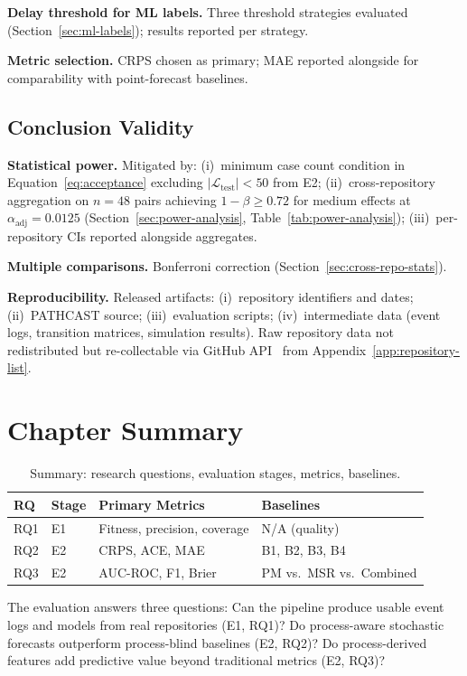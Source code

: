 \textbf{Delay threshold for ML labels.} Three threshold strategies
evaluated (Section~\ref{sec:ml-labels}); results reported per strategy.

\textbf{Metric selection.} CRPS chosen as primary; MAE reported
alongside for comparability with point-forecast baselines.


\subsection{Conclusion Validity}
\label{sec:threats-conclusion}

\textbf{Statistical power.} Mitigated by:
(i)~minimum case count condition in Equation~\ref{eq:acceptance}
excluding $|\mathcal{L}_{\text{test}}| < 50$ from E2;
(ii)~cross-repository aggregation on $n = 48$ pairs achieving
$1-\beta \geq 0.72$ for medium effects at
$\alpha_{\text{adj}} = 0.0125$
(Section~\ref{sec:power-analysis}, Table~\ref{tab:power-analysis});
(iii)~per-repository CIs reported alongside aggregates.

\textbf{Multiple comparisons.} Bonferroni correction
(Section~\ref{sec:cross-repo-stats}).

\textbf{Reproducibility.} Released artifacts: (i)~repository identifiers
and dates; (ii)~PATHCAST source; (iii)~evaluation scripts;
(iv)~intermediate data (event logs, transition matrices, simulation
results). Raw repository data not redistributed but
re-collectable via GitHub API~\cite{github2023api} from
Appendix~\ref{app:repository-list}.


\section{Chapter Summary}
\label{sec:methodology-summary}

\begin{table}[htbp]
\centering
\caption{Summary: research questions, evaluation stages, metrics, baselines.}
\label{tab:methodology-summary}
\small
\begin{tabular}{llll}
\toprule
\textbf{RQ} & \textbf{Stage} & \textbf{Primary Metrics} & \textbf{Baselines} \\
\midrule
RQ1 & E1 & Fitness, precision, coverage    & N/A (quality) \\
RQ2 & E2 & CRPS, ACE, MAE                  & B1, B2, B3, B4 \\
RQ3 & E2 & AUC-ROC, F1, Brier              & PM vs.\ MSR vs.\ Combined \\
\bottomrule
\end{tabular}
\end{table}

The evaluation answers three questions: Can the pipeline produce usable
event logs and models from real repositories (E1, RQ1)? Do process-aware
stochastic forecasts outperform process-blind baselines (E2, RQ2)? Do
process-derived features add predictive value beyond traditional metrics
(E2, RQ3)?
